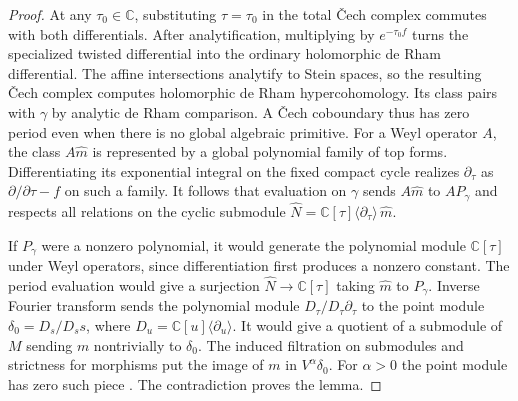 \begin{proof}
At any \(\tau_0\in\mathbb C\), substituting \(\tau=\tau_0\)
in the total \v{C}ech complex commutes with both differentials.
After analytification, multiplying by \(e^{-\tau_0 f}\) turns the
specialized twisted differential into the ordinary holomorphic de
Rham differential. The affine intersections analytify to Stein
spaces, so the resulting \v{C}ech complex computes holomorphic de
Rham hypercohomology. Its class pairs with \(\gamma\) by analytic
de Rham comparison. A \v{C}ech coboundary thus has zero period
even when there is no global algebraic primitive. For a Weyl
operator \(A\), the class \(A\widehat m\) is represented by a global
polynomial family of top forms. Differentiating its exponential
integral on the fixed compact cycle realizes \(\partial_\tau\)
as \(\partial/\partial\tau-f\) on such a family. It follows that
evaluation on \(\gamma\) sends \(A\widehat m\) to \(A P_\gamma\)
and respects all relations on the cyclic submodule
\(\widehat N=\mathbb C[\tau]\langle\partial_\tau\rangle\,\widehat m\).

If \(P_\gamma\) were a nonzero polynomial, it would generate the
polynomial module \(\mathbb C[\tau]\) under Weyl operators, since
differentiation first produces a nonzero constant. The period
evaluation would give a surjection
\(\widehat N\to\mathbb C[\tau]\) taking \(\widehat m\) to \(P_\gamma\).
Inverse Fourier transform sends the polynomial module
\(D_\tau/D_\tau\partial_\tau\) to the point module
\(\delta_0=D_s/D_s s\), where \(D_u=\mathbb C[u]\langle\partial_u\rangle\).
It would give a quotient of a submodule of \(M\) sending \(m\)
nontrivially to \(\delta_0\). The induced filtration on submodules
and strictness for morphisms
\cite[Proposition~3.19(ii) and Corollary~3.20]{chen-dirks-mustata}
put the image of \(m\) in \(V^\alpha\delta_0\). For \(\alpha>0\)
the point module has zero such piece
\cite[Example~3.18]{chen-dirks-mustata}.
The contradiction proves the lemma.
\end{proof}
